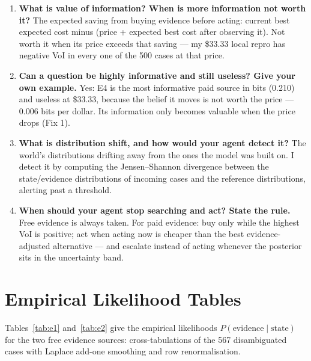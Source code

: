 \documentclass{article}
\begin{document}
\begin{enumerate}
\item \textbf{What is value of information? When is more information not worth it?} The expected saving from buying evidence before acting: current best expected cost minus (price + expected best cost after observing it). Not worth it when its price exceeds that saving --- my \$33.33 local repro has negative VoI in every one of the 500 cases at that price.
\item \textbf{Can a question be highly informative and still useless? Give your own example.} Yes: E4 is the most informative paid source in bits (0.210) and useless at \$33.33, because the belief it moves is not worth the price --- 0.006 bits per dollar. Its information only becomes valuable when the price drops (Fix 1).
\item \textbf{What is distribution shift, and how would your agent detect it?} The world's distributions drifting away from the ones the model was built on. I detect it by computing the Jensen--Shannon divergence between the state/evidence distributions of incoming cases and the reference distributions, alerting past a threshold.
\item \textbf{When should your agent stop searching and act? State the rule.} Free evidence is always taken. For paid evidence: buy only while the highest VoI is positive; act when acting now is cheaper than the best evidence-adjusted alternative --- and escalate instead of acting whenever the posterior sits in the uncertainty band.
\end{enumerate}

\section{Empirical Likelihood Tables}
\label{app:likelihoods}

Tables~\ref{tab:e1} and~\ref{tab:e2} give the empirical likelihoods $P(\text{evidence} \mid \text{state})$ for the two free evidence sources: cross-tabulations of the 567 disambiguated cases with Laplace add-one smoothing and row renormalisation.
\end{document}
